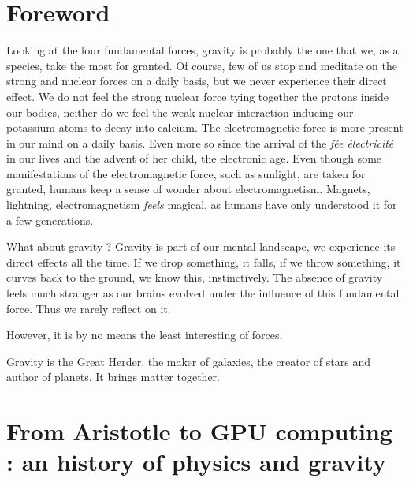 



\section*{Foreword}

Looking at the four fundamental forces, gravity is probably the one that we, as a species, take the most for granted. Of course, few of us stop and meditate on the strong and nuclear forces on a daily basis, but we never experience their direct effect. We do not feel the strong nuclear force tying together the protons inside our bodies,  neither do we feel the weak nuclear interaction inducing our potassium atoms to decay into calcium. The electromagnetic force is more present in our mind on a daily basis. Even more so since the arrival of the \textit{f\'ee \'electricit\'e} in our lives and the advent of her child, the electronic age. Even though some manifestations of the electromagnetic force, such as sunlight, are taken for granted, humans keep a sense of wonder about electromagnetism. Magnets, lightning, electromagnetism \textit{feels} magical, as humans have only understood it for a few generations.

What about gravity ? Gravity is part of our mental landscape, we experience its direct effects all the time. If we drop something, it falls, if we throw something, it curves back to the ground, we know this, instinctively. The absence of gravity feels much stranger as our brains evolved under the influence of this fundamental force. Thus we rarely reflect on it. 

However, it is by no means the least interesting of forces.
 
Gravity is the Great Herder, the maker of galaxies, the creator of stars and author of planets. It brings matter together.  



\section{From Aristotle to GPU computing : an history of physics and gravity}

